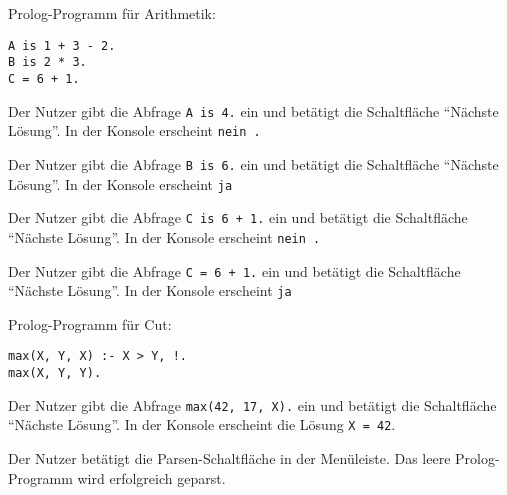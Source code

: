 \documentclass[parskip=full,11pt,twoside]{scrartcl}
\begin{document}
Prolog-Programm für Arithmetik:
\label{tst:maths_prog}
\begin{lstlisting}
A is 1 + 3 - 2.
B is 2 * 3.
C = 6 + 1.
\end{lstlisting}

{Der Nutzer gibt die Abfrage \texttt{A is 4.} ein und betätigt die Schaltfläche \enquote{Nächste Lösung}.}
{In der Konsole erscheint \texttt{nein .}}

{Der Nutzer gibt die Abfrage \texttt{B is 6.} ein und betätigt die Schaltfläche \enquote{Nächste Lösung}.}
{In der Konsole erscheint \texttt{ja}}

{Der Nutzer gibt die Abfrage \texttt{C is 6 + 1.} ein und betätigt die Schaltfläche \enquote{Nächste Lösung}.}
{In der Konsole erscheint \texttt{nein .}}

{Der Nutzer gibt die Abfrage \texttt{C = 6 + 1.} ein und betätigt die Schaltfläche \enquote{Nächste Lösung}.}
{In der Konsole erscheint \texttt{ja}}


Prolog-Programm für Cut:
\label{tst:cut_prog}
\begin{lstlisting}
max(X, Y, X) :- X > Y, !.
max(X, Y, Y).
\end{lstlisting}

{Der Nutzer gibt die Abfrage \texttt{max(42, 17, X).} ein und betätigt die Schaltfläche \enquote{Nächste Lösung}.}
{In der Konsole erscheint die Lösung \texttt{X = 42}.}


{Der Nutzer betätigt die Parsen-Schaltfläche in der Menüleiste.}
{Das leere Prolog-Programm wird erfolgreich geparst.}
\end{document}

